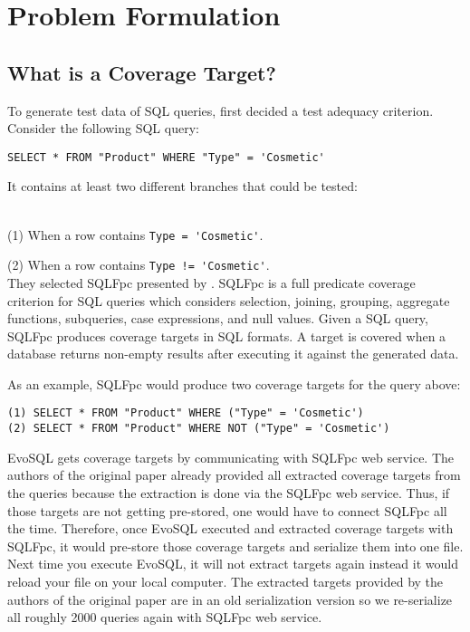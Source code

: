 \chapter{Problem Formulation}

\section{What is a Coverage Target?}
\label{sec:what_is_a_coverage_target}

To generate test data of SQL queries, \cite{castelein2018search} first decided a test adequacy criterion. Consider the following SQL query:

\begin{verbatim}
SELECT * FROM "Product" WHERE "Type" = 'Cosmetic'
\end{verbatim}
It contains at least two different branches that could be tested:

\\
(1) When a row contains \verb|Type = 'Cosmetic'|.

(2) When a row contains \verb|Type != 'Cosmetic'|.
\\

They selected SQLFpc presented by \cite{de2010constraint}. SQLFpc is a full predicate coverage criterion for SQL queries which considers selection, joining, grouping, aggregate functions, subqueries, case expressions, and null values. Given a SQL query, SQLFpc produces coverage targets in SQL formats. A target is covered when a database returns non-empty results after executing it against the generated data.

As an example, SQLFpc would produce two coverage targets for the query above:
\begin{verbatim}
(1) SELECT * FROM "Product" WHERE ("Type" = 'Cosmetic')
(2) SELECT * FROM "Product" WHERE NOT ("Type" = 'Cosmetic')
\end{verbatim}

EvoSQL gets coverage targets by communicating with SQLFpc web service. The authors of the original paper already provided all extracted coverage targets from the queries because the extraction is done via the SQLFpc web service. Thus, if those targets are not getting pre-stored, one would have to connect SQLFpc all the time. Therefore, once EvoSQL executed and extracted coverage targets with SQLFpc, it would pre-store those coverage targets and serialize them into one file. Next time you execute EvoSQL, it will not extract targets again instead it would reload your file on your local computer. 
The extracted targets provided by the authors of the original paper are in an old serialization version so we re-serialize all roughly 2000 queries again with SQLFpc web service.

